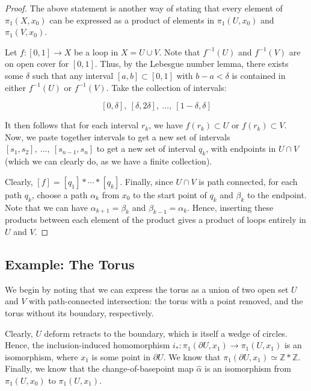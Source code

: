 \documentclass[10pt, oneside]{amsart}
\begin{document}
    \begin{proof}
      The above statement is another way of stating that every element of $\pi_1(X, x_0)$ can be expressed as a product of elements in $\pi_1(U, x_0)$ and $\pi_1(V, x_0)$.
      \newline

      Let $f : [0, 1] \rightarrow X$ be a loop in $X = U \cup V$. Note that $f^{-1}(U)$ and $f^{-1}(V)$ are on open cover for $[0, 1]$. Thus, by the Lebesgue number lemma, there exists some $\delta$ such
      that any interval $[a, b] \subset [0, 1]$ with $b - a < \delta$ is contained in either $f^{-1}(U)$ or $f^{-1}(V)$. Take the collection of intervals:

      $$[0, \delta], \ [\delta, 2 \delta], \ ..., \ [1 - \delta, \delta]$$

      It then follows that for each interval $r_k$, we have $f(r_k) \subset U$ or $f(r_k) \subset V$. Now, we paste together intervals to get a new set of intervals
      $[s_1, s_2], \ ..., \ [s_{n - 1}, s_n]$ to get a new set of interval $q_k$, with endpoints in $U \cap V$ (which we can clearly do, as we have a finite collection).
      \newline

      Clearly, $[f] = [q_1] * \cdots * [q_k]$. Finally, since $U \cap V$ is path connected, for each path $q_k$, choose a path $\alpha_k$ from $x_0$ to the start point of $q_k$ and
      $\beta_k$ to the endpoint. Note that we can have $\alpha_{k + 1} = \beta_k$ and $\beta_{k - 1} = \alpha_k$. Hence, inserting these products between each element of the product
      gives a product of loops entirely in $U$ and $V$.
    \end{proof}

    \newpage

    \subsection{Example: The Torus}

    We begin by noting that we can express the torus as a union of two open set $U$ and $V$ with path-connected intersection: the torus with a point removed, and the torus without its boundary, respectively.
    \newline

    Clearly, $U$ deform retracts to the boundary, which is itself a wedge of circles. Hence, the inclusion-induced homomorphism $i_{*} : \pi_1(\partial U, x_1) \rightarrow \pi_1(U, x_1)$ is an isomorphism, where $x_1$
    is some point in $\partial U$. We know that $\pi_1(\partial U, x_1) \simeq \mathbb{Z} * \mathbb{Z}$. Finally, we know that the change-of-basepoint map $\hat{\alpha}$ is an isomorphism from $\pi_1(U, x_0)$ to $\pi_1(U, x_1)$.
    \newline
\end{document}
